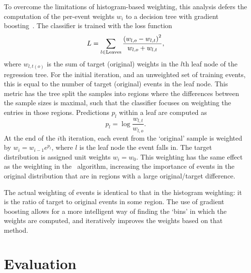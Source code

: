 To overcome the limitations of histogram-based weighting, this analysis defers
the computation of the per-event weights $w_{i}$ to a decision tree with
gradient boosting~\cite{Rogozhnikov:2016bdp}.
The classifier is trained with the loss function
\begin{equation}
  L = \sum_{l \in \text{Leaves}} \frac{%
    {(w_{l,o} - w_{l,t})}^{2}
  }{%
    w_{l,o} + w_{l,t}
  },
\end{equation}
where $w_{l,t(o)}$ is the sum of target (original) weights in the $l$th leaf
node of the regression tree.
For the initial iteration, and an unweighted set of training events, this is
equal to the number of target (original) events in the leaf node.
This metric has the tree split the samples into regions where the differences
between the sample sizes is maximal, such that the classifier focuses on
weighting the entries in those regions.
Predictions $p_{l}$ within a leaf are computed as
\begin{equation}
  p_{l} = \log{\frac{w_{l,t}}{w_{l,o}}}.
\end{equation}
At the end of the $i$th iteration, each event from the `original' sample is
weighted by $w_{i} = w_{i - 1}e^{p_{l}}$, where $l$ is the leaf node the event
falls in.
The target distribution is assigned unit weights $w_{i} = w_{0}$.
This weighting has the same effect as the weighting in the \adaboost\
algorithm, increasing the importance of events in the original distribution
that are in regions with a large original/target difference.

The actual weighting of events is identical to that in the histogram weighting:
it is the ratio of target to original events in some region.
The use of gradient boosting allows for a more intelligent way of finding the
`bins' in which the weights are computed, and iteratively improves the weights
based on that method.

\section{Evaluation}
\label{chap:cpv:kinematic_weighting:evaluation}

